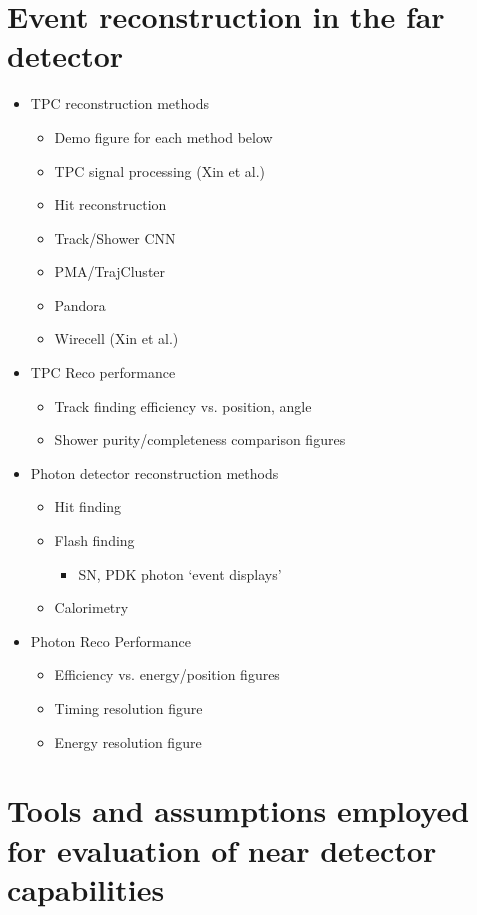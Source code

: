 \section{Event reconstruction in the far detector}
\label{sec:tools-fdreco}

\begin{itemize}
\item TPC reconstruction methods
\begin{itemize}
\item Demo figure for each method below
\item TPC signal processing (Xin et al.)
\item Hit reconstruction
\item Track/Shower CNN
\item PMA/TrajCluster
\item Pandora
\item Wirecell (Xin et al.)
\end{itemize}
\item TPC Reco performance
\begin{itemize} 
\item Track finding efficiency vs. position, angle
\item Shower purity/completeness comparison figures 
\end{itemize}
\item Photon detector reconstruction methods
\begin{itemize}
\item Hit finding
\item Flash finding
\begin{itemize} \item SN, PDK photon `event displays' \end{itemize}
\item Calorimetry
\end{itemize}
\item Photon Reco Performance
\begin{itemize}
\item Efficiency vs. energy/position figures
\item Timing resolution figure
\item Energy resolution figure
\end{itemize}
\end{itemize}


\section{Tools and assumptions employed for evaluation of near detector capabilities}
\label{sec:tools-nd-eval}



